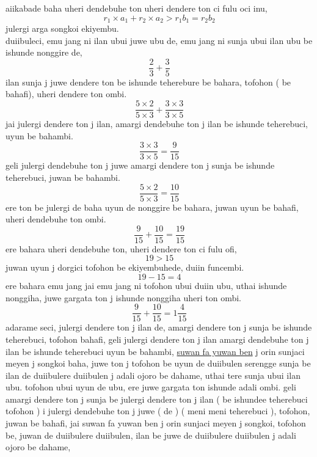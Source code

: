\documentclass{report}
\begin{document}
aiikabade baha uheri dendebuhe ton uheri dendere ton ci fulu oci inu,
\[
    r_1\times a_1+r_2\times a_2 > r_1 b_1=r_2 b_2
\]
julergi arga songkoi ekiyembu.\\

duiibuleci, emu jang ni ilan ubui juwe ubu de, emu jang ni sunja ubui ilan ubu be ishunde nonggire de, 
\[ \frac{2}{3} + \frac{3}{5}\]
ilan sunja j juwe dendere ton be ishunde teherebure be bahara, tofohon ( be bahafi), uheri dendere ton ombi.
\[ \frac{5\times 2}{5\times 3} + \frac{3\times 3}{3\times 5}\]
jai julergi dendere ton j ilan, amargi dendebuhe ton j ilan be ishunde teherebuci, uyun be bahambi.
\[
    \frac{3\times 3}{3\times 5} = \frac{9}{15}
\] geli julergi dendebuhe ton j juwe amargi dendere ton j sunja be ishunde teherebuci, juwan be bahambi.
\[
    \frac{5\times 2}{5\times 3} = \frac{10}{15}
\]
ere ton be julergi de baha uyun de nonggire be bahara, juwan uyun be bahafi, uheri dendebuhe ton ombi.
\[
    \frac{9}{15} + \frac{10}{15} = \frac{19}{15}
\]
ere bahara uheri dendebuhe ton, uheri dendere ton ci fulu ofi, 
\[
    19 > 15
\]
juwan uyun j dorgici tofohon be ekiyembuhede, duiin funcembi.
\[19-15=4\]
ere bahara emu jang jai emu jang ni tofohon ubui duiin ubu, uthai ishunde nonggiha, juwe gargata ton j ishunde nonggiha uheri ton ombi.
\[ \frac{9}{15} + \frac{10}{15} = 1\frac{4}{15} \]
adarame seci, julergi dendere ton j ilan de, amargi dendere ton j sunja be ishunde teherebuci, tofohon bahafi, geli julergi dendere ton j ilan amargi dendebuhe ton j ilan be ishunde teherebuci uyun be bahambi, \underline{\setRtoL suwan fa yuwan ben} j orin sunjaci meyen j songkoi baha, juwe ton j tofohon be uyun de duiibulen serengge sunja be ilan de duiibulere duiibulen j adali ojoro be dahame, uthai tere sunja ubui ilan ubu. tofohon ubui uyun de ubu, ere juwe gargata ton ishunde adali ombi. geli amargi dendere ton j sunja be julergi dendere ton j ilan ( be ishundee teherebuci tofohon ) i julergi dendebuhe ton j juwe ( de ) ( meni meni teherebuci ), tofohon, juwan be bahafi, jai suwan fa yuwan ben j orin sunjaci meyen j songkoi, tofohon be, juwan de duiibulere duiibulen, ilan be juwe de duiibulere duiibulen j adali ojoro be dahame, 

\end{document}
